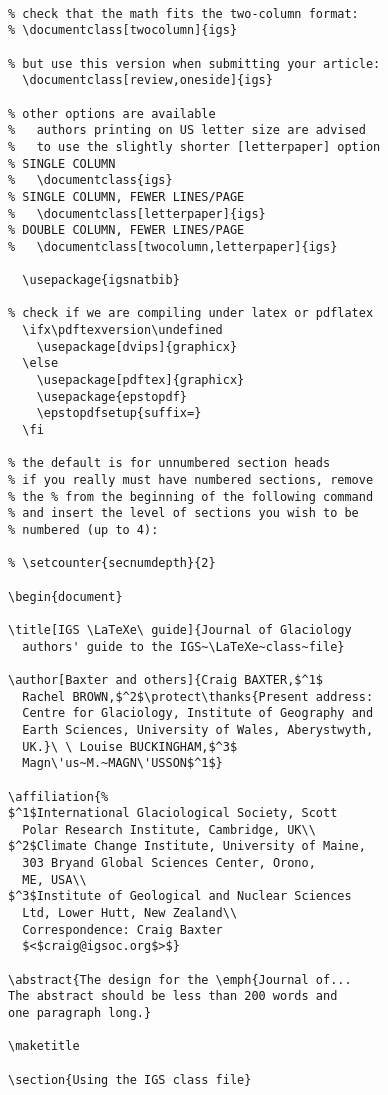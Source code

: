\documentclass[review,oneside]{igs}
\begin{document}
\begin{verbatim}

% check that the math fits the two-column format:
% \documentclass[twocolumn]{igs}

% but use this version when submitting your article:
  \documentclass[review,oneside]{igs}

% other options are available
%   authors printing on US letter size are advised 
%   to use the slightly shorter [letterpaper] option
% SINGLE COLUMN
%   \documentclass{igs}              
% SINGLE COLUMN, FEWER LINES/PAGE
%   \documentclass[letterpaper]{igs} 
% DOUBLE COLUMN, FEWER LINES/PAGE
%   \documentclass[twocolumn,letterpaper]{igs} 
   
  \usepackage{igsnatbib}

% check if we are compiling under latex or pdflatex
  \ifx\pdftexversion\undefined
    \usepackage[dvips]{graphicx}
  \else
    \usepackage[pdftex]{graphicx}
    \usepackage{epstopdf}
    \epstopdfsetup{suffix=}
  \fi

% the default is for unnumbered section heads
% if you really must have numbered sections, remove
% the % from the beginning of the following command
% and insert the level of sections you wish to be
% numbered (up to 4):

% \setcounter{secnumdepth}{2}

\begin{document}

\title[IGS \LaTeXe\ guide]{Journal of Glaciology 
  authors' guide to the IGS~\LaTeXe~class~file}

\author[Baxter and others]{Craig BAXTER,$^1$
  Rachel BROWN,$^2$\protect\thanks{Present address:
  Centre for Glaciology, Institute of Geography and
  Earth Sciences, University of Wales, Aberystwyth,
  UK.}\ \ Louise BUCKINGHAM,$^3$ 
  Magn\'us~M.~MAGN\'USSON$^1$}

\affiliation{%
$^1$International Glaciological Society, Scott
  Polar Research Institute, Cambridge, UK\\
$^2$Climate Change Institute, University of Maine,
  303 Bryand Global Sciences Center, Orono,
  ME, USA\\
$^3$Institute of Geological and Nuclear Sciences
  Ltd, Lower Hutt, New Zealand\\
  Correspondence: Craig Baxter 
  $<$craig@igsoc.org$>$}

\abstract{The design for the \emph{Journal of... 
The abstract should be less than 200 words and 
one paragraph long.}

\maketitle

\section{Using the IGS class file}

\end{verbatim}
\end{document}
